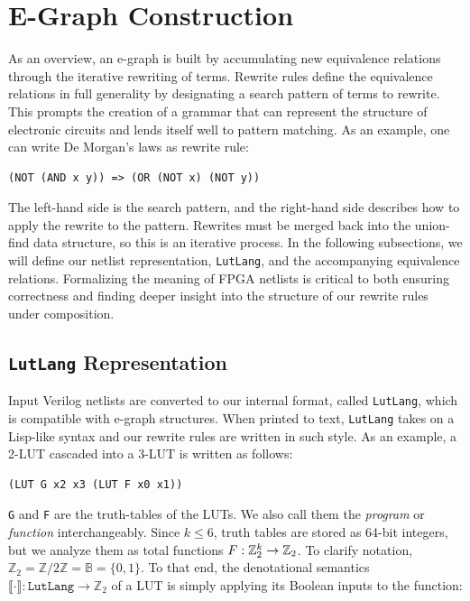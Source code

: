 \section{E-Graph Construction}\label{sec:rewrites}
As an overview, an e-graph is built by accumulating new equivalence relations
through the iterative rewriting of terms. Rewrite rules define the equivalence
relations in full generality by designating a search pattern of terms to
rewrite. This prompts the creation of a grammar that can represent the
structure of electronic circuits and lends itself well to pattern matching. As
an example, one can write De Morgan's laws as rewrite rule:

\begin{lstlisting}
(NOT (AND x y)) => (OR (NOT x) (NOT y))
\end{lstlisting}

The left-hand side is the search pattern, and the right-hand side describes how
to apply the rewrite to the pattern. Rewrites must be merged back into the
union-find data structure, so this is an iterative process. In the following
subsections, we will define our netlist representation, \texttt{LutLang}, and
the accompanying equivalence relations. Formalizing the meaning of FPGA
netlists is critical to both ensuring correctness and finding deeper insight
into the structure of our rewrite rules under composition.

\subsection{\texttt{LutLang} Representation}\label{sec:rewrites:lutlang}

Input Verilog netlists are converted to our internal format, called
\texttt{LutLang}, which is compatible with e-graph structures. When printed to
text, \texttt{LutLang} takes on a Lisp-like syntax and our rewrite rules are
written in such style. As an example, a 2-LUT cascaded into a 3-LUT is written
as follows:

\begin{lstlisting}
(LUT G x2 x3 (LUT F x0 x1))
\end{lstlisting}

\texttt{G} and \texttt{F} are the truth-tables of the LUTs.
We also call them the \textit{program} or \textit{function} interchangeably.
Since $k \leq 6$, truth tables are stored as 64-bit integers, but we analyze them as total functions $F: \mathbb{Z}_{2}^{k} \rightarrow \mathbb{Z}_{2}$.
To clarify notation, $\mathbb{Z}_2 = \mathbb{Z}/2\mathbb{Z} = \mathbb{B} = \{0,1\}$.
To that end, the denotational semantics $\llbracket \cdot \rrbracket : \texttt{LutLang} \rightarrow \mathbb{Z}_2$ of a LUT is simply applying its Boolean inputs to the function:

